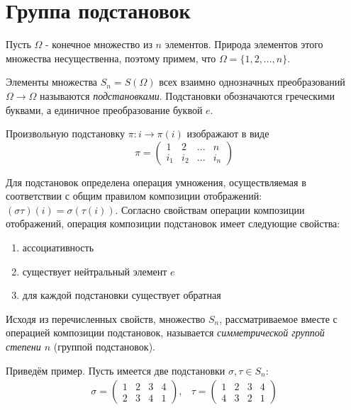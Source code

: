 \section{Группа подстановок}

Пусть $\Omega$ - конечное множество из $n$ элементов. Природа элементов этого множества несущественна, поэтому примем, что $\Omega = \{1,2,...,n\}$.

\begin{definition}
    Элементы множества $S_n=S(\Omega)$ всех взаимно однозначных преобразований $\Omega\to\Omega$ называются \textit{подстановками}. Подстановки обозначаются греческими буквами, а единичное преобразование буквой $e$.
\end{definition}

Произвольную подстановку $\pi: i\to \pi(i)$ изображают в виде
\begin{equation*}
    \pi = 
    \begin{pmatrix}
        1 & 2 & ... & n \\
        i_1 & i_2 & ... & i_n
    \end{pmatrix}
\end{equation*}


Для подстановок определена операция умножения, осуществляемая в соответствии с общим правилом композиции отображений: $(\sigma\tau)(i)=\sigma(\tau(i))$. Согласно свойствам операции композиции отображений, операция композиции подстановок имеет следующие свойства:
\begin{enumerate}
    \item ассоциативность
    \item существует нейтральный элемент $e$
    \item для каждой подстановки существует обратная
\end{enumerate}

\begin{definition}
    Исходя из перечисленных свойств, множество $S_n$, рассматриваемое вместе с операцией композиции подстановок, называется \textit{симметрической группой степени $n$} (группой подстановок).
\end{definition}

Приведём пример. Пусть имеется две подстановки $\sigma, \tau \in S_n$:
\begin{equation*}
    \begin{matrix}
        \sigma=\begin{pmatrix}
            1&2&3&4\\
            2&3&4&1
        \end{pmatrix},
        &
        \tau=\begin{pmatrix}
            1&2&3&4\\
            4&3&2&1
        \end{pmatrix}
    \end{matrix}
\end{equation*}

